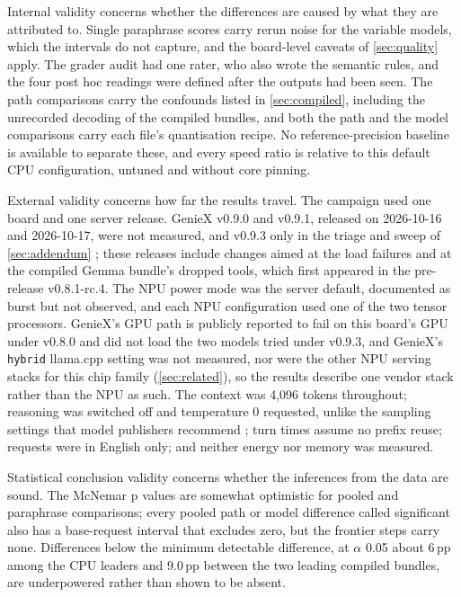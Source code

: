 \documentclass[11pt]{article}
\begin{document}
Internal validity concerns whether the differences are caused by what they are attributed to. Single paraphrase scores carry rerun noise for the variable models, which the intervals do not capture, and the board-level caveats of \cref{sec:quality} apply. The grader audit had one rater, who also wrote the semantic rules, and the four post hoc readings were defined after the outputs had been seen. The path comparisons carry the confounds listed in \cref{sec:compiled}, including the unrecorded decoding of the compiled bundles, and both the path and the model comparisons carry each file's quantisation recipe. No reference-precision baseline is available to separate these, and every speed ratio is relative to this default CPU configuration, untuned and without core pinning.

External validity concerns how far the results travel. The campaign used one board and one server release. GenieX v0.9.0 and v0.9.1, released on 2026-10-16 and 2026-10-17, were not measured, and v0.9.3 only in the triage and sweep of \cref{sec:addendum} \citep{geniex2026}; these releases include changes aimed at the load failures and at the compiled Gemma bundle's dropped tools, which first appeared in the pre-release v0.8.1-rc.4. The NPU power mode was the server default, documented as burst but not observed, and each NPU configuration used one of the two tensor processors. GenieX's GPU path is publicly reported to fail on this board's GPU under v0.8.0 \citep{geniexPR1538} and did not load the two models tried under v0.9.3, and GenieX's \texttt{hybrid} llama.cpp setting was not measured, nor were the other NPU serving stacks for this chip family (\cref{sec:related}), so the results describe one vendor stack rather than the NPU as such. The context was 4,096 tokens throughout; reasoning was switched off and temperature 0 requested, unlike the sampling settings that model publishers recommend \citep{qwen3cards}; turn times assume no prefix reuse; requests were in English only; and neither energy nor memory was measured.

Statistical conclusion validity concerns whether the inferences from the data are sound. The McNemar p values are somewhat optimistic for pooled and paraphrase comparisons; every pooled path or model difference called significant also has a base-request interval that excludes zero, but the frontier steps carry none. Differences below the minimum detectable difference, at $\alpha$ 0.05 about 6\,pp among the CPU leaders and 9.0\,pp between the two leading compiled bundles, are underpowered rather than shown to be absent.
\end{document}
